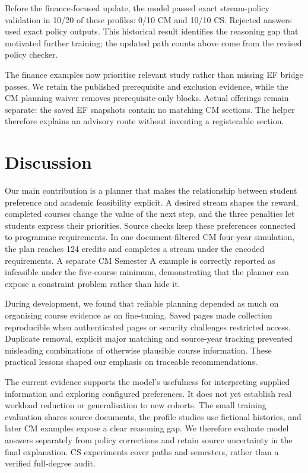 \documentclass{article}
\begin{document}
Before the finance-focused update, the model passed exact stream-policy validation in 10/20 of these profiles: 0/10 CM and 10/10 CS. Rejected answers used exact policy outputs. This historical result identifies the reasoning gap that motivated further training; the updated path counts above come from the revised policy checker.

The finance examples now prioritise relevant study rather than missing EF bridge passes. We retain the published prerequisite and exclusion evidence\citep{cityu-finance}, while the CM planning waiver removes prerequisite-only blocks. Actual offerings remain separate: the saved EF snapshots contain no matching CM sections. The helper therefore explains an advisory route without inventing a registerable section.

\newpage
\section{Discussion}
Our main contribution is a planner that makes the relationship between student preference and academic feasibility explicit. A desired stream shapes the reward, completed courses change the value of the next step, and the three penalties let students express their priorities. Source checks keep these preferences connected to programme requirements. In one document-filtered CM four-year simulation, the plan reaches 124 credits and completes a stream under the encoded requirements. A separate CM Semester A example is correctly reported as infeasible under the five-course minimum, demonstrating that the planner can expose a constraint problem rather than hide it.

During development, we found that reliable planning depended as much on organising course evidence as on fine-tuning. Saved pages made collection reproducible when authenticated pages or security challenges restricted access. Duplicate removal, explicit major matching and source-year tracking prevented misleading combinations of otherwise plausible course information. These practical lessons shaped our emphasis on traceable recommendations.

The current evidence supports the model's usefulness for interpreting supplied information and exploring configured preferences. It does not yet establish real workload reduction or generalisation to new cohorts. The small training evaluation shares source documents, the profile studies use fictional histories, and later CM examples expose a clear reasoning gap. We therefore evaluate model answers separately from policy corrections and retain source uncertainty in the final explanation. CS experiments cover paths and semesters, rather than a verified full-degree audit.
\end{document}
